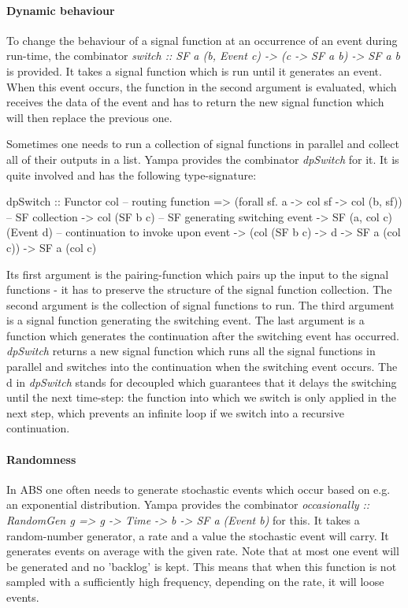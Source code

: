 \paragraph{Dynamic behaviour}
To change the behaviour of a signal function at an occurrence of an event during run-time, the combinator \textit{switch :: SF a (b, Event c) -> (c -> SF a b) -> SF a b} is provided. It takes a signal function which is run until it generates an event. When this event occurs, the function in the second argument is evaluated, which receives the data of the event and has to return the new signal function which will then replace the previous one.

Sometimes one needs to run a collection of signal functions in parallel and collect all of their outputs in a list. Yampa provides the combinator \textit{dpSwitch} for it. It is quite involved and has the following type-signature:

\begin{HaskellCode}
dpSwitch :: Functor col
         -- routing function
         => (forall sf. a -> col sf -> col (b, sf))
         -- SF collection
         -> col (SF b c)
         -- SF generating switching event     
         -> SF (a, col c) (Event d)
         -- continuation to invoke upon event           
         -> (col (SF b c) -> d -> SF a (col c))
         -> SF a (col c)
\end{HaskellCode}

Its first argument is the pairing-function which pairs up the input to the signal functions - it has to preserve the structure of the signal function collection. The second argument is the collection of signal functions to run. The third argument is a signal function generating the switching event. The last argument is a function which generates the continuation after the switching event has occurred. \textit{dpSwitch} returns a new signal function which runs all the signal functions in parallel and switches into the continuation when the switching event occurs. The d in \textit{dpSwitch} stands for decoupled which guarantees that it delays the switching until the next time-step: the function into which we switch is only applied in the next step, which prevents an infinite loop if we switch into a recursive continuation.

\paragraph{Randomness}
In ABS one often needs to generate stochastic events which occur based on e.g. an exponential distribution. Yampa provides the combinator \textit{occasionally :: RandomGen g => g -> Time -> b -> SF a (Event b)} for this. It takes a random-number generator, a rate and a value the stochastic event will carry. It generates events on average with the given rate. Note that at most one event will be generated and no 'backlog' is kept. This means that when this function is not sampled with a sufficiently high frequency, depending on the rate, it will loose events.


